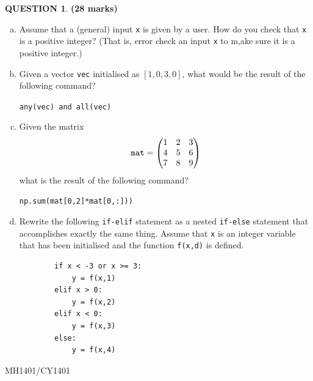 \documentclass[a4paper,12pt]{article}
\theoremstyle{definition}
\newtheorem{ques}[dummy]{QUESTION}
\theoremstyle{plain}
\newcommand{\ttx}[1]{\texttt{#1}}
\begin{document}
\begin{ques}\hfill \textbf{(28 marks)}\\
	\begin{enumerate}[(a)]
		\item Assume that a (general) input \texttt{x} is given by a user. How do you check that \ttx{x} is a positive integer? (That is, error check an input \ttx{x} to m,ake sure it is a positive integer.)
		
		\item Given a vector \ttx{vec} initialised as $[1, 0, 3, 0]$, what would be the result of the following command?\vspace*{1em}
		
		\ttx{any(vec) and all(vec)}
		
		\item Given the matrix\begin{equation*}
		\text{\ttx{mat}} = \begin{pmatrix*}
		1 & 2 & 3\\4 & 5 & 6\\7 & 8 & 9
		\end{pmatrix*}
		\end{equation*}
		what is the result of the following command?\vspace*{1em}
		
		\texttt{np.sum(mat[0,2]*mat[0,:]))}
		
		\item Rewrite the following \texttt{if-elif} statement as a nested \texttt{if-else} statement that accomplishes exactly the same thing. Assume that \texttt{x} is an integer variable that has been initialised and the function \texttt{f(x,d)} is defined.
		\begin{verbatim}
		if x < -3 or x >= 3:
		    y = f(x,1)
		elif x > 0:
		    y = f(x,2)
		elif x < 0:
		    y = f(x,3)
		else:
		    y = f(x,4)
		\end{verbatim}
	\end{enumerate}
\end{ques}

\newpage

\hfill MH1401/CY1401\vspace*{0.5em}
\end{document}
